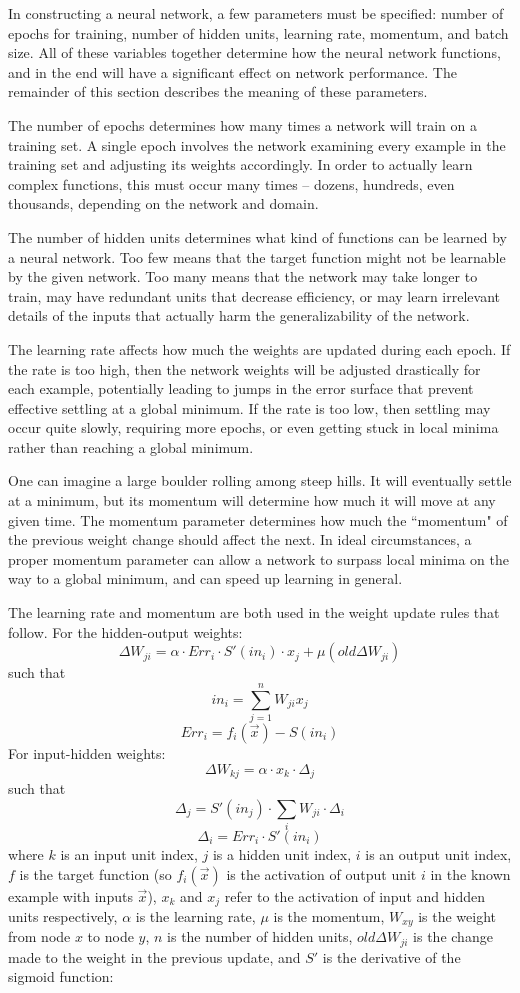 \documentclass[10pt, conference, compsocconf]{IEEEtran}
\begin{document}
In constructing a neural network, a few parameters must be specified: number of epochs for training, number of hidden units, learning rate, momentum, and batch size. All of these variables together determine how the neural network functions, and in the end will have a significant effect on network performance. The remainder of this section describes the meaning of these parameters.

The number of epochs determines how many times a network will train on a training set. A single epoch involves the network examining every example in the training set and adjusting its weights accordingly. In order to actually learn complex functions, this must occur many times -- dozens, hundreds, even thousands, depending on the network and domain.

The number of hidden units determines what kind of functions can be learned by a neural network. Too few means that the target function might not be learnable by the given network. Too many means that the network may take longer to train, may have redundant units that decrease efficiency, or may learn irrelevant details of the inputs that actually harm the generalizability of the network.

The learning rate affects how much the weights are updated during each epoch. If the rate is too high, then the network weights will be adjusted drastically for each example, potentially leading to jumps in the error surface that prevent effective settling at a global minimum. If the rate is too low, then settling may occur quite slowly, requiring more epochs, or even getting stuck in local minima rather than reaching a global minimum.
 
One can imagine a large boulder rolling among steep hills. It will eventually settle at a minimum, but its momentum will determine how much it will move at any given time. The momentum parameter determines how much the ``momentum" of the previous weight change should affect the next. In ideal circumstances, a proper momentum parameter can allow a network to surpass local minima on the way to a global minimum, and can speed up learning in general.

The learning rate and momentum are both used in the weight update rules that follow. For the hidden-output weights:
$$\Delta W_{ji} = \alpha \cdot Err_i \cdot S'(in_i) \cdot x_j + \mu(old\Delta W_{ji})$$
such that
$$in_i = \sum_{j = 1}^n W_{ji}x_j$$
$$Err_i = f_i(\vec{x}) - S(in_i)$$
For input-hidden weights:
$$\Delta W_{kj} = \alpha \cdot x_k \cdot \Delta_j$$
such that
$$\Delta_j = S'(in_j) \cdot \sum_{i} W_{ji} \cdot \Delta_i$$
$$\Delta_i = Err_i \cdot S'(in_i)$$
where $k$ is an input unit index, $j$ is a hidden unit index, $i$ is an output unit index, $f$ is the target function (so $f_i(\vec{x})$ is the activation of output unit $i$ in the known example with inputs $\vec{x}$), $x_k$ and $x_j$ refer to the activation of input and hidden units respectively, $\alpha$ is the learning rate, $\mu$ is the momentum, $W_{xy}$ is the weight from node $x$ to node $y$, $n$ is the number of hidden units, $old\Delta W_{ji}$ is the change made to the weight in the previous update, and $S'$ is the derivative of the sigmoid function:
\end{document}
